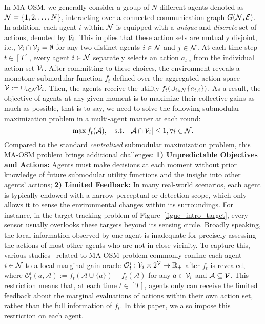 In MA-OSM, we generally consider a group of $N$ different agents denoted as $\mathcal{N}=\{1,2,\ldots,N\}$, interacting over a connected communication graph $G(\mathcal{N},\mathcal{E})$. In addition, each agent $i$ within $\mathcal{N}$ is equipped with a \emph{unique} and \emph{discrete} set of actions, denoted by $\mathcal{V}_{i}$. This implies that these action sets are mutually disjoint, i.e., $\mathcal{V}_{i}\cap\mathcal{V}_{j}=\emptyset$ for any two distinct agents $i\in\mathcal{N}$ and $j\in\mathcal{N}$. At each time step $t\in[T]$, every agent $i\in\mathcal{N}$ separately selects an action $a_{t,i}$ from the individual action set $\mathcal{V}_{i}$. After committing to these choices, the environment reveals a monotone submodular function $f_{t}$ defined over the aggregated action space $\mathcal{V}:=\cup_{i\in\mathcal{N}}\mathcal{V}_{i}$. Then, the agents receive the utility $f_{t}(\cup_{i\in\mathcal{N}}\{a_{t,i}\})$. As a result, the objective of agents at any given moment is to maximize their collective gains as much as possible, that is to say, we need to solve the following submodular maximization problem in a multi-agent manner at each round: 
 \begin{equation}\label{equ:problem_t}
\max f_{t}(\mathcal{A}),\ \ \text{ s.t.}\ \  |\mathcal{A}\cap\V_{i}|\le1,\forall i\in\N.
\end{equation} 
Compared to the standard \emph{centralized}  submodular maximization problem, this MA-OSM problem brings additional challenges: \textbf{1) Unpredictable Objectives and Actions:} Agents must make decisions at each moment without prior knowledge of future submodular utility functions and the insight into other agents' actions; \textbf{2) Limited Feedback:} In many real-world scenarios, each agent is typically endowed with a narrow perceptual or detection scope, which only allows it to sense the environmental changes within its surroundings.  For instance, in the target tracking problem of Figure~\ref{figue_intro_target}, every sensor usually overlooks these targets beyond its sensing circle. Broadly speaking, the local information observed by one agent is inadequate for precisely assessing the actions of most other agents who are not in close vicinity. To capture this, various studies~\citep{xu2023online,rezazadeh2023distributed,robey2021optimal,qu2019distributed} related to MA-OSM problem commonly confine each agent $i\in\mathcal{N}$ to a local marginal gain oracle $\mathcal{O}_{t}^{i}:\mathcal{V}_{i}\times2^{\mathcal{V}}\rightarrow\mathbb{R}_{+}$ after  $f_{t}$ is revealed, where $\mathcal{O}_{t}^{i}(a,\mathcal{A}):=f_{t}(\mathcal{A}\cup\{a\})-f_{t}(\mathcal{A})$  for any $a\in\mathcal{V}_{i}$ and $\mathcal{A}\subseteq\mathcal{V}$. This restriction means that, at each time $t\in[T]$, agents only can receive the limited feedback about the marginal evaluations of actions within their own action set, rather than the full information of $f_{t}$. In this paper, we also impose this restriction on each agent.


